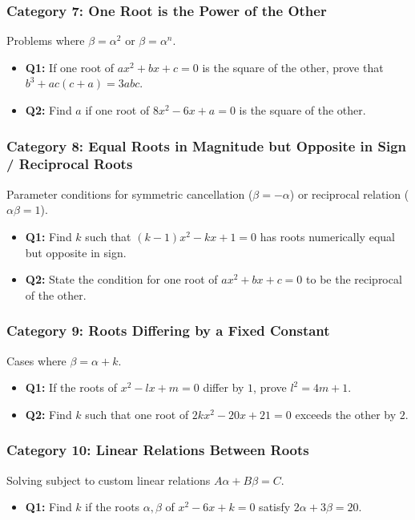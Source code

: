 \documentclass[10pt,a4paper]{article}
\begin{document}
\subsubsection{Category 7: One Root is the Power of the Other}
Problems where $\beta = \alpha^2$ or $\beta = \alpha^n$.
\begin{itemize}[leftmargin=*]
    \item \textbf{Q1:} If one root of $ax^2 + bx + c = 0$ is the square of the other, prove that $b^3 + ac(c+a) = 3abc$.
    \item \textbf{Q2:} Find $a$ if one root of $8x^2 - 6x + a = 0$ is the square of the other.
\end{itemize}

\subsubsection{Category 8: Equal Roots in Magnitude but Opposite in Sign / Reciprocal Roots}
Parameter conditions for symmetric cancellation ($\beta = -\alpha$) or reciprocal relation ($\alpha\beta = 1$).
\begin{itemize}[leftmargin=*]
    \item \textbf{Q1:} Find $k$ such that $(k-1)x^2 - kx + 1 = 0$ has roots numerically equal but opposite in sign.
    \item \textbf{Q2:} State the condition for one root of $ax^2 + bx + c = 0$ to be the reciprocal of the other.
\end{itemize}

\subsubsection{Category 9: Roots Differing by a Fixed Constant}
Cases where $\beta = \alpha + k$.
\begin{itemize}[leftmargin=*]
    \item \textbf{Q1:} If the roots of $x^2 - lx + m = 0$ differ by $1$, prove $l^2 = 4m + 1$.
    \item \textbf{Q2:} Find $k$ such that one root of $2kx^2 - 20x + 21 = 0$ exceeds the other by $2$.
\end{itemize}

\subsubsection{Category 10: Linear Relations Between Roots}
Solving subject to custom linear relations $A\alpha + B\beta = C$.
\begin{itemize}[leftmargin=*]
    \item \textbf{Q1:} Find $k$ if the roots $\alpha, \beta$ of $x^2 - 6x + k = 0$ satisfy $2\alpha + 3\beta = 20$.
\end{itemize}
\end{document}
